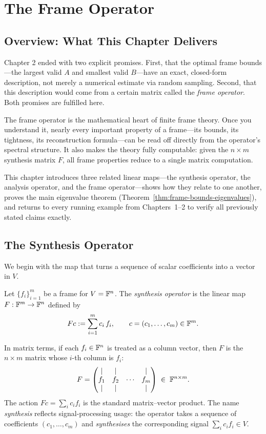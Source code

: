 \chapter{The Frame Operator}
\label{ch:frame-operator}
\section{Overview: What This Chapter Delivers}
\label{sec:ch3-overview}

Chapter 2 ended with two explicit promises. First, that the optimal frame
bounds---the largest valid $A$ and smallest valid $B$---have an exact,
closed-form description, not merely a numerical estimate via random
sampling. Second, that this description would come from a certain matrix
called the \emph{frame operator}. Both promises are fulfilled here.

The frame operator is the mathematical heart of finite frame theory. Once
you understand it, nearly every important property of a frame---its
bounds, its tightness, its reconstruction formula---can be read off
directly from the operator's spectral structure. It also makes the theory
fully computable: given the $n\times m$ synthesis matrix $F$, all frame
properties reduce to a single matrix computation.

This chapter introduces three related linear maps---the synthesis
operator, the analysis operator, and the frame operator---shows how they
relate to one another, proves the main eigenvalue theorem
(Theorem~\ref{thm:frame-bounds-eigenvalues}), and returns to every
running example from Chapters~1--2 to verify all previously stated claims
exactly.

\section{The Synthesis Operator}
\label{sec:synthesis-operator}

We begin with the map that turns a sequence of scalar coefficients into a
vector in $V$.

\begin{definition}
\label{def:synthesis-operator}
Let $\{f_i\}_{i=1}^m$ be a frame for $V = \mathbb{F}^n$. The
\emph{synthesis operator} is the linear map $F : \mathbb{F}^m \to \mathbb{F}^n$ defined
by
\[
  F c := \sum_{i=1}^m c_i\, f_i, \qquad c = (c_1,\ldots,c_m)\in\mathbb{F}^m.
\]
\end{definition}

In matrix terms, if each $f_i\in\mathbb{F}^n$ is treated as a column vector, then
$F$ is the $n\times m$ matrix whose $i$-th column is $f_i$:
\[
  F =
  \begin{pmatrix}
    | & | & & | \\
    f_1 & f_2 & \cdots & f_m \\
    | & | & & |
  \end{pmatrix}
  \;\in\; \mathbb{F}^{n\times m}.
\]
The action $Fc = \sum_i c_i f_i$ is the standard matrix--vector product.
The name \emph{synthesis} reflects signal-processing usage: the operator
takes a sequence of coefficients $(c_1,\ldots,c_m)$ and
\emph{synthesises} the corresponding signal $\sum_i c_i f_i\in V$.

